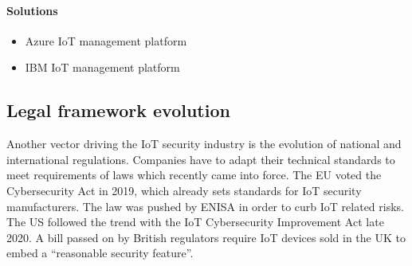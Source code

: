 \paragraph{Solutions}

\begin{itemize}
	\item Azure IoT management platform
	\item IBM IoT management platform
\end{itemize}


\subsection{Legal framework evolution}

Another vector driving the IoT security industry is the evolution of national and international regulations. Companies have to adapt their technical standards to meet requirements of laws which recently came into force. The EU voted the Cybersecurity Act in 2019, which already sets standards for IoT security manufacturers. The law was pushed by ENISA in order to curb IoT related risks. The US followed the trend with the IoT Cybersecurity Improvement Act late 2020. A bill passed on by British regulators require IoT devices sold in the UK to embed a “reasonable security feature”.
